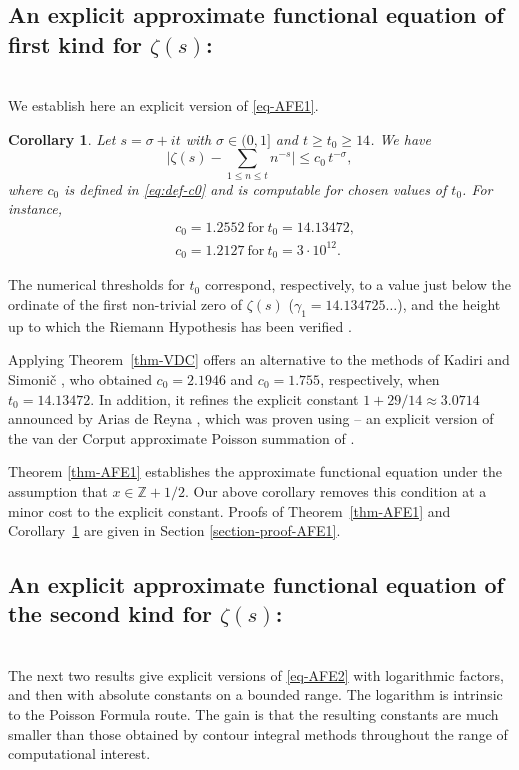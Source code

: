 \documentclass[11pt,letterpaper,oneside,reqno]{amsart}
\renewcommand{\^}[1]{\widehat{#1}}
\newcommand{\s}{\sigma}
\numberwithin{equation}{section}
\newtheorem{corollary}{Corollary}[theorem]
\theoremstyle{remark}
\newcommand*{\thmref}[1]{Theorem~\ref{#1}}
\newcommand*{\corref}[1]{Corollary~\ref{#1}}
\begin{document}
\subsection{An explicit approximate functional equation of first kind for $\zeta(s)$:}\ \\
We establish here an explicit version of \eqref{eq-AFE1}. 
%
\begin{corollary}\label{cor:all_t}
Let $s = \sigma + it$ with $\s \in (0,1]$ and $t \geq  t_0 \geq 14 $. We have 
\begin{equation}\label{eq:AF1cor}
\bigg|  \zeta(s) - \sum_{ 1\leq n \leq t } n^{-s} \bigg|  \leq c_0\,t^{-\s},
\end{equation} 
where $c_0$ is defined in \eqref{eq:def-c0} and is computable for chosen values of $t_0$. For instance, 
\begin{align}
& c_0 = 1.2552
%
\ \text{for} \ t_0=14.13472,    \\
&c_0=1.2127 \ \text{for} \  t_0=3\cdot10^{12}.
\end{align}
\end{corollary}
%
The numerical thresholds for $t_0$ correspond, respectively, to a value just below the ordinate of the first non-trivial zero of $\zeta(s)$ ($\gamma_1 = 14.134725\dots$), and the height up to which the Riemann Hypothesis has been verified \cite{Platt_2021}.
\smallskip 

Applying \thmref{thm-VDC} offers an alternative to the methods of Kadiri \cite[Corollary 1.3]{Kadiri2013} and Simoni\v{c} \cite[Corollary 2]{Simonic2020}, who obtained $c_0=2.1946$ and $c_0=1.755$, respectively, when $t_0=14.13472.$ In addition, it refines the explicit constant $1+29/14 \approx 3.0714$ announced by Arias de Reyna \cite[Theorem 6]{dereyna2024approximationzetafunctiondirichlet}, which was proven using \cite[Lemma 4]{dereyna2024approximationzetafunctiondirichlet}-- an explicit version of the van der Corput approximate Poisson summation of \cite[Lemma 4.7]{Titchmarsh}.
\smallskip 

Theorem \ref{thm-AFE1} establishes the approximate functional equation under the assumption that $x \in \mathbb{Z} + 1/2$. Our above corollary removes this condition at a minor cost to the explicit constant. Proofs of \thmref{thm-AFE1} and  \corref{cor:all_t} are given in Section \ref{section-proof-AFE1}. 

\medskip
\subsection{An explicit approximate functional equation of the second kind for $\zeta(s)$:}\ \\
The next two results give explicit versions of \eqref{eq-AFE2} with logarithmic factors, and then with absolute constants on a bounded range.
The logarithm is intrinsic to the Poisson Formula route. The gain is that the resulting constants are much smaller than those obtained by contour integral methods throughout the range of computational interest.
\smallskip 
\end{document}
